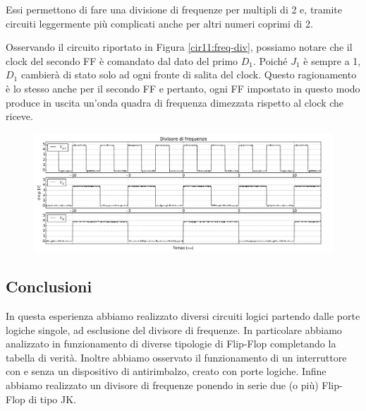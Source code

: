 Essi permettono di fare una divisione di frequenze per multipli di 2 e, tramite circuiti leggermente più complicati anche per altri numeri coprimi di 2.



Osservando il circuito riportato in Figura \ref{cir11:freq-div}, possiamo notare che il clock del secondo FF è comandato dal dato del primo $D_1$.
Poiché $J_1$ è sempre a 1, $D_1$ cambierà di stato solo ad ogni fronte di salita del clock.
Questo ragionamento è lo stesso anche per il secondo FF e pertanto, ogni FF impostato in questo modo produce in uscita un'onda quadra di frequenza dimezzata rispetto al clock che riceve.

\begin{figure}[htpc]
\centering
	\includegraphics[width=.98\textwidth]{../E11/latex/gfreq.pdf}
	\caption{}
	\label{gr11:freq}
\end{figure}

\subsection*{Conclusioni}

In questa esperienza abbiamo realizzato diversi circuiti logici partendo dalle porte logiche singole, ad esclusione del divisore di frequenze.
In particolare abbiamo analizzato in funzionamento di diverse tipologie di Flip-Flop completando la tabella di verità.
Inoltre abbiamo osservato il funzionamento di un interruttore con e senza un dispositivo di antirimbalzo, creato con porte logiche.
Infine abbiamo realizzato un divisore di frequenze ponendo in serie due (o più) Flip-Flop di tipo JK.

